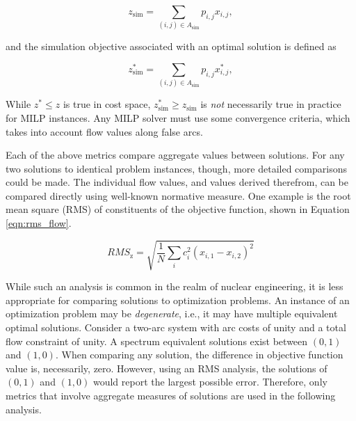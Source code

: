 \begin{equation}\label{eqn:sim_flow}
z_{\text{sim}} = \sum_{(i, j) \in A_{\text{sim}}} p_{i, j} x_{i, j},
\end{equation}

\noindent 
and the simulation objective associated with an optimal solution is defined as

\begin{equation}\label{eqn:sim_flow}
z^*_{\text{sim}} = \sum_{(i, j) \in A_{\text{sim}}} p_{i, j} x^*_{i, j},
\end{equation}

While $z^* \leq z$ is true in cost space, $z^*_{\text{sim}} \geq z_{\text{sim}}$
is \textit{not} necessarily true in practice for MILP instances. Any MILP solver
must use some convergence criteria, which takes into account flow values along
false arcs. 



Each of the above metrics compare aggregate values between solutions. For any
two solutions to identical problem instances, though, more detailed comparisons
could be made. The individual flow values, and values derived therefrom, can be
compared directly using well-known normative measure. One example is the root
mean square (RMS) of constituents of the objective function, shown in Equation
\ref{eqn:rms_flow}.

\begin{equation}\label{eqn:rms_flow}
RMS_{\text{z}} = \sqrt{ \frac{1}{N} \sum_i c_i^2 (x_{i, 1} - x_{i, 2}) ^2 }
\end{equation}

While such an analysis is common in the realm of nuclear engineering, it is less
appropriate for comparing solutions to optimization problems. An instance of an
optimization problem may be \textit{degenerate}, i.e., it may have multiple
equivalent optimal solutions. Consider a two-arc system with arc costs of unity
and a total flow constraint of unity. A spectrum equivalent solutions exist
between $(0, 1)$ and $(1, 0)$. When comparing any solution, the difference in
objective function value is, necessarily, zero. However, using an RMS analysis,
the solutions of $(0, 1)$ and $(1, 0)$ would report the largest possible
error. Therefore, only metrics that involve aggregate measures of solutions are
used in the following analysis.
